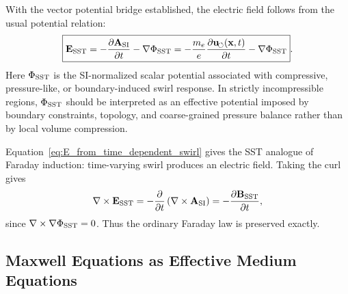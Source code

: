     With the vector potential bridge established, the electric field follows
    from the usual potential relation:
    \begin{equation}
        \boxed{
            \mathbf{E}_{\rm SST}
            =
            -\frac{\partial\mathbf{A}_{\rm SI}}{\partial t}
            -
            \nabla\Phi_{\rm SST}
            =
            -\frac{m_e}{e}
            \frac{\partial\mathbf{u}_{\!\boldsymbol{\circlearrowleft}}(\mathbf{x},t)}{\partial t}
            -
            \nabla\Phi_{\rm SST}
        } .
        \label{eq:E_from_time_dependent_swirl}
    \end{equation}
    Here \(\Phi_{\rm SST}\) is the SI-normalized scalar potential associated
    with compressive, pressure-like, or boundary-induced swirl response.  In
    strictly incompressible regions, \(\Phi_{\rm SST}\) should be interpreted
    as an effective potential imposed by boundary constraints, topology, and
    coarse-grained pressure balance rather than by local volume compression.
    
    Equation~\eqref{eq:E_from_time_dependent_swirl} gives the SST analogue of
    Faraday induction: time-varying swirl produces an electric field.  Taking
    the curl gives
    \begin{equation}
        \nabla\times\mathbf{E}_{\rm SST}
        =
        -
        \frac{\partial}{\partial t}
        \left(
            \nabla\times\mathbf{A}_{\rm SI}
        \right)
        =
        -
        \frac{\partial\mathbf{B}_{\rm SST}}{\partial t},
        \label{eq:faraday_from_swirl}
    \end{equation}
    since \(\nabla\times\nabla\Phi_{\rm SST}=0\).  Thus the ordinary Faraday
    law is preserved exactly.

\subsection{Maxwell Equations as Effective Medium Equations}
    
